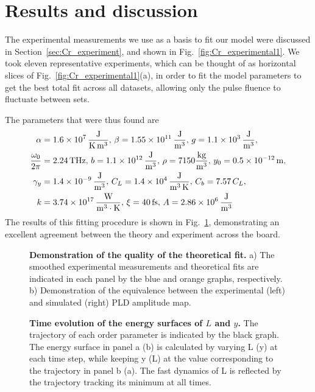 \section{Results and discussion \label{sec:Cr_results}}
The experimental measurements we use as a basis to fit our model were discussed in Section~\ref{sec:Cr_experiment}, and shown in Fig.~\ref{fig:Cr_experimental1}.
We took eleven representative experiments, which can be thought of as horizontal slices of Fig.~\ref{fig:Cr_experimental1}(a), in order to fit the model parameters to get the best total fit across all datasets, allowing only the pulse fluence to fluctuate between sets.

The parameters that were thus found are
\begin{align}
	\alpha &= \SI{1.6e7} {\rm \frac{J}{K\, m^3}},\, \beta = \SI{1.55e11} {\rm \frac{J}{m^3}},\, g = \SI{1.1e3}{\rm \frac{J}{m^3}}, \\
	\frac{\omega_0}{2\pi} &= 2.24\, {\rm THz},\, b = \SI{1.1e12} {\rm \frac{J}{m^3}},\, \rho = 7150 {\rm \frac{kg}{m^3}},\, y_0 = \SI{0.5e-12} {\rm m},\\
	\gamma_y &= \SI{1.4e-9}{\rm \frac{J}{m^3}}, \, C_L = \SI{1.4e4}{\rm \frac{J}{m^3\,K}},\, C_b = 7.57\,C_L,\\
	k &= \SI{3.74e17} {\rm \frac{W}{m^3\cdot K}},\, \xi = 40\,{\rm fs},\,A = \SI{2.86e6}{\rm \frac{J}{m^3}}
\end{align}
The results of this fitting procedure is shown in Fig.~\ref{fig:Cr_theoretical_fit}, demonstrating an excellent agreement between the theory and experiment across the board.
\begin{figure}
\caption{\label{fig:Cr_theoretical_fit} {\bf Demonstration of the quality of the theoretical fit.} a) The smoothed experimental measurements and theoretical fits are indicated in each panel by the blue and orange graphs, respectively. b) Demonstration of the equivalence between the experimental (left) and simulated (right) \gls{PLD} amplitude map.}
\end{figure}
\begin{figure}
	\centering
	\caption{\label{fig:Cr_energy_surfaces}{\bf Time evolution of the energy surfaces of $L$ and $y$.} The trajectory of each order parameter is indicated by the black graph. The energy surface in panel a (b) is calculated by varying L (y) at each time step, while keeping y (L) at the value corresponding to the trajectory in panel b (a). The fast dynamics of L is reflected by the trajectory tracking its minimum at all times.}
\end{figure}

